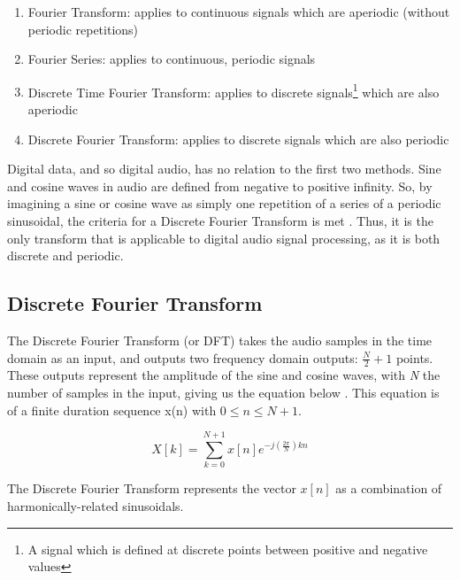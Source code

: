 \begin{enumerate}
    \item Fourier Transform: applies to continuous signals which are aperiodic (without periodic repetitions)
    \item Fourier Series: applies to continuous, periodic signals
    \item Discrete Time Fourier Transform: applies to discrete signals\footnote{A signal which is defined at discrete points between positive and negative values} which are also aperiodic
    \item Discrete Fourier Transform: applies to discrete signals which are also periodic
\end{enumerate}

Digital data, and so digital audio, has no relation to the first two methods. Sine and cosine waves in audio are defined from negative to positive infinity. So, by imagining a sine or cosine wave as simply one repetition of a series of a periodic sinusoidal, the criteria for a Discrete Fourier Transform is met \cite{Zjalic_2021}. Thus, it is the only transform that is applicable to digital audio signal processing, as it is both discrete and periodic.

\subsection{Discrete Fourier Transform}
The Discrete Fourier Transform (or DFT) takes the audio samples in the time domain as an input, and outputs two frequency domain outputs: $\frac{N}{2} + 1$ points. These outputs represent the amplitude of the sine and cosine waves, with \textit{N} the number of samples in the input, giving us the equation below \cite{Gold_Morgan_Ellis_2011}. This equation is of a finite duration sequence x(n)
with $0 \leq n \leq N + 1$.

\begin{equation}\label{eq:dft-equation}
    X[k] = \sum_{k=0}^{N+1}x[n]e^{-j (\frac{2\pi}{N})kn}
\end{equation}

The Discrete Fourier Transform represents the vector $x[n]$ as a combination of harmonically-related sinusoidals. 
